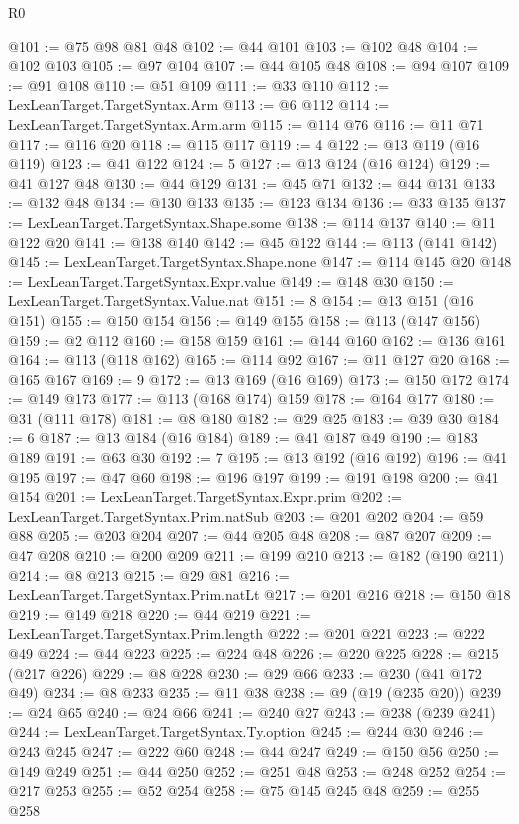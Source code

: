 \begin{lexlean}{R0}
\begin{coremodule}
{{{{{{{{{{{{{{{{{{{{{{{{{{{{{{{{{{{{{{{{{{{{{{{{{{{{{{{{{{{{{{{{{{{{{{{{{@101 := @75 @98 @81 @48
@102 := @44 @101
@103 := @102 @48
@104 := @102 @103
@105 := @97 @104
@107 := @44 @105 @48
@108 := @94 @107
@109 := @91 @108
@110 := @51 @109
@111 := @33 @110
@112 := LexLeanTarget.TargetSyntax.Arm
@113 := @6 @112
@114 := LexLeanTarget.TargetSyntax.Arm.arm
@115 := @114 @76
@116 := @11 @71
@117 := @116 @20
@118 := @115 @117
@119 := 4
@122 := @13 @119 (@16 @119)
@123 := @41 @122
@124 := 5
@127 := @13 @124 (@16 @124)
@129 := @41 @127 @48
@130 := @44 @129
@131 := @45 @71
@132 := @44 @131
@133 := @132 @48
@134 := @130 @133
@135 := @123 @134
@136 := @33 @135
@137 := LexLeanTarget.TargetSyntax.Shape.some
@138 := @114 @137
@140 := @11 @122 @20
@141 := @138 @140
@142 := @45 @122
@144 := @113 (@141 @142)
@145 := LexLeanTarget.TargetSyntax.Shape.none
@147 := @114 @145 @20
@148 := LexLeanTarget.TargetSyntax.Expr.value
@149 := @148 @30
@150 := LexLeanTarget.TargetSyntax.Value.nat
@151 := 8
@154 := @13 @151 (@16 @151)
@155 := @150 @154
@156 := @149 @155
@158 := @113 (@147 @156)
@159 := @2 @112
@160 := @158 @159
@161 := @144 @160
@162 := @136 @161
@164 := @113 (@118 @162)
@165 := @114 @92
@167 := @11 @127 @20
@168 := @165 @167
@169 := 9
@172 := @13 @169 (@16 @169)
@173 := @150 @172
@174 := @149 @173
@177 := @113 (@168 @174) @159
@178 := @164 @177
@180 := @31 (@111 @178)
@181 := @8 @180
@182 := @29 @25
@183 := @39 @30
@184 := 6
@187 := @13 @184 (@16 @184)
@189 := @41 @187 @49
@190 := @183 @189
@191 := @63 @30
@192 := 7
@195 := @13 @192 (@16 @192)
@196 := @41 @195
@197 := @47 @60
@198 := @196 @197
@199 := @191 @198
@200 := @41 @154
@201 := LexLeanTarget.TargetSyntax.Expr.prim
@202 := LexLeanTarget.TargetSyntax.Prim.natSub
@203 := @201 @202
@204 := @59 @88
@205 := @203 @204
@207 := @44 @205 @48
@208 := @87 @207
@209 := @47 @208
@210 := @200 @209
@211 := @199 @210
@213 := @182 (@190 @211)
@214 := @8 @213
@215 := @29 @81
@216 := LexLeanTarget.TargetSyntax.Prim.natLt
@217 := @201 @216
@218 := @150 @18
@219 := @149 @218
@220 := @44 @219
@221 := LexLeanTarget.TargetSyntax.Prim.length
@222 := @201 @221
@223 := @222 @49
@224 := @44 @223
@225 := @224 @48
@226 := @220 @225
@228 := @215 (@217 @226)
@229 := @8 @228
@230 := @29 @66
@233 := @230 (@41 @172 @49)
@234 := @8 @233
@235 := @11 @38
@238 := @9 (@19 (@235 @20))
@239 := @24 @65
@240 := @24 @66
@241 := @240 @27
@243 := @238 (@239 @241)
@244 := LexLeanTarget.TargetSyntax.Ty.option
@245 := @244 @30
@246 := @243 @245
@247 := @222 @60
@248 := @44 @247
@249 := @150 @56
@250 := @149 @249
@251 := @44 @250
@252 := @251 @48
@253 := @248 @252
@254 := @217 @253
@255 := @52 @254
@258 := @75 @145 @245 @48
@259 := @255 @258
}}}}}}}}}}}}}}}}}}}}}}}}}}}}}}}}}}}}}}}}}}}}}}}}}}}}}}}}}}}}}}}}}}}}}}}}}
\end{coremodule}
\end{lexlean}
